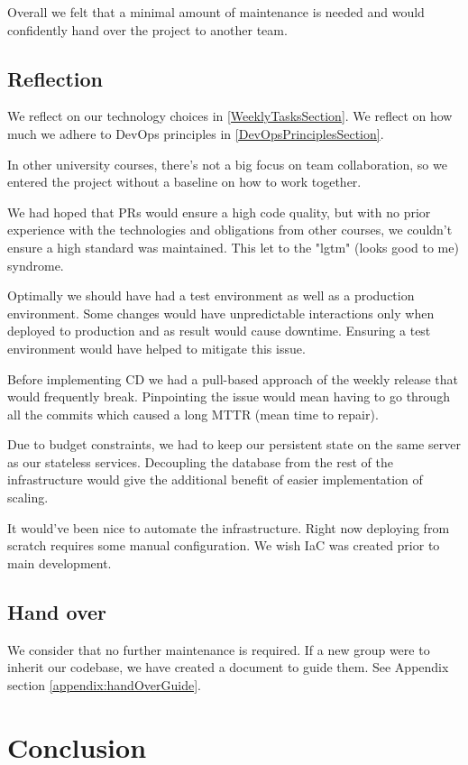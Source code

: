 \documentclass{article}
\begin{document}
Overall we felt that a minimal amount of maintenance is needed and would confidently hand over the project to another team. 

\subsection{Reflection}

We reflect on our technology choices in \ref{WeeklyTasksSection}.
We reflect on how much we adhere to DevOps principles in \ref{DevOpsPrinciplesSection}.

In other university courses, there's not a big focus on team collaboration, so we entered the project without a baseline on how to work together.

We had hoped that PRs would ensure a high code quality, but with no prior experience with the technologies and obligations from other courses, we couldn't ensure a high standard was maintained. This let to the "lgtm" (looks good to me) syndrome.

Optimally we should have had a test environment as well as a production environment. Some changes would have unpredictable interactions only when deployed to production and as result would cause downtime.  Ensuring a test environment would have helped to mitigate this issue.

Before implementing CD we had a pull-based approach of the weekly release that would frequently break. Pinpointing the issue would mean having to go through all the commits which caused a long MTTR (mean time to repair). 

Due to budget constraints, we had to keep our persistent state on the same server as our stateless services. Decoupling the database from the rest of the infrastructure would give the additional benefit of easier implementation of scaling. 

It would've been nice to automate the infrastructure. Right now deploying from scratch requires some manual configuration. We wish IaC was created prior to main development. 


\subsection{Hand over}

We consider that no further maintenance is required. If a new group were to inherit our codebase, we have created a document to guide them. See Appendix section \ref{appendix:handOverGuide}. 

\section{Conclusion}
\end{document}
